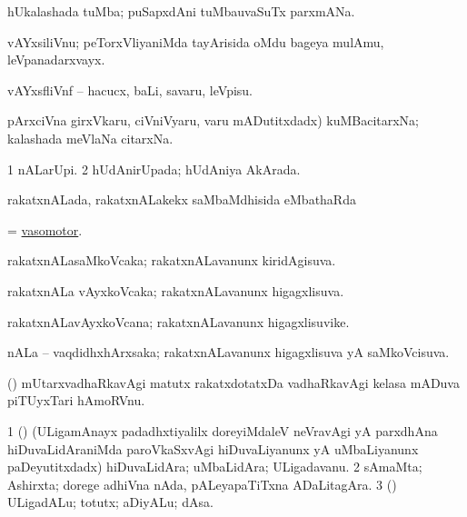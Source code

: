 \bentry
{} 
\gl{\nA}
\bmng
 hUkalashada tuMba; puSapxdAni tuMbauvaSuTx parxmANa. 
\emng
\eentry

\bentry
{} 
\gl{\nA}
\expl{(\P)}
\bmng
 vAYxsiliVnu; peTorxVliyaniMda tayArisida oMdu bageya mulAmu, leVpanadarxvayx. 
\emng
\eentry

\bentry
{} 
\gl{\sakirx}
\expl{}
\bmng
 vAYxsfliVnf -- hacucx, baLi, savaru, leVpisu. 
\emng
\eentry

\bentry
{}
\gl{\nA}
\expl{}
\bmng
 \eng{(} pArxciVna girxVkaru, ciVniVyaru, \mo varu mADutitxdadx) kuMBacitarxNa; kalashada meVlaNa citarxNa. 
\emng
\eentry

\bentry
{} 
\gl{\gu}
\expl{}
\bmng
\bnum
\num{1} nALarUpi. 
\num{2} hUdAnirUpada; hUdAniya AkArada. 
\enum
\emng
\eentry

\bentry
{} 
\gl{\sapUpa}
\expl{}
\bmng
 rakatxnALada, rakatxnALakekx saMbaMdhisida eMbathaRda \sapUpa 
\emng
\eentry

\bentry
{} 
\gl{\gu}
\expl{}
\bmng
 = \hyperlink{vasomotor}{vasomotor}. 
\emng
\eentry

\bentry
{} 
\gl{\gu}
\expl{}
\bmng
 rakatxnALasaMkoVcaka; rakatxnALavanunx kiridAgisuva. 
\emng
\eentry

\bentry
{} 
\gl{\gu}
\expl{}
\bmng
 rakatxnALa vAyxkoVcaka; rakatxnALavanunx higagxlisuva. 
\emng
\eentry

\bentry
{} 
\gl{\nA}
\expl{}
\bmng
 rakatxnALavAyxkoVcana; rakatxnALavanunx higagxlisuvike. 
\emng
\eentry

\bentry
{} 
\gl{\gu}
\expl{}
\bmng
 nALa -- vaqdidhxhArxsaka; rakatxnALavanunx higagxlisuva yA saMkoVcisuva. 
\emng
\eentry

\bentry
{} 
\gl{\nA}
\expl{}
\bmng
 (\jiVra) mUtarxvadhaRkavAgi matutx rakatxdotatxDa vadhaRkavAgi kelasa mADuva piTUyxTari hAmoRVnu. 
\emng
\eentry

\bentry
{} 
\gl{\nA}
\expl{}
\bmng
\bnum
\num{1} (\ca) (ULigamAnayx padadhxtiyalilx doreyiMdaleV neVravAgi yA parxdhAna hiDuvaLidAraniMda paroVkaSxvAgi hiDuvaLiyanunx yA uMbaLiyanunx paDeyutitxdadx) hiDuvaLidAra; uMbaLidAra; ULigadavanu. 
\num{2} sAmaMta; Ashirxta; dorege adhiVna nAda, pALeyapaTiTxna ADaLitagAra. 
\num{3} (\rUpa) ULigadALu; totutx; aDiyALu; dAsa. 
\enum
\emng
\eentry

